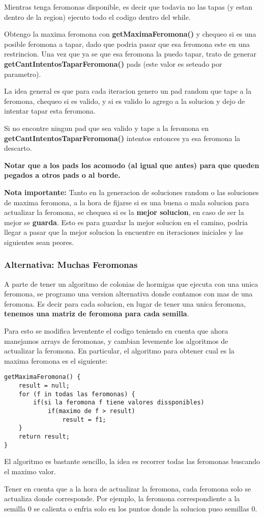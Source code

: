 Mientras tenga feromonas disponible, es decir que todavia no las tapas (y estan dentro de la region) ejecuto todo el codigo dentro del while. 

Obtengo la maxima feromona con \textbf{getMaximaFeromona()} y chequeo si es una posible feromona a tapar, dado que podria pasar que esa feromona este en una restrincion. 
Una vez que ya se que esa feromona la puedo tapar, trato de generar \textbf{getCantIntentosTaparFeromona()} pads (este valor es seteado por parametro). 

La idea general es que para cada iteracion genero un pad random que tape a la feromona, chequeo si es valido, y si es valido lo agrego a la solucion y dejo de intentar tapar esta feromona.

Si no encontre ningun pad que sea valido y tape a la feromona en \textbf{getCantIntentosTaparFeromona()} intentos entonces ya esa feromona la descarto. 

\textbf{Notar que a los pads los acomodo (al igual que antes) para que queden pegados a otros pads o al borde.}

\textbf{Nota importante:} Tanto en la generacion de soluciones random o las soluciones de maxima feromona, a la hora de fijarse si es una buena o mala solucion para actualizar la feromona, se chequea si es la \textbf{mejor solucion}, en caso de ser la mejor se \textbf{guarda}. Esto es para guardar la mejor solucion en el camino, podria llegar a pasar que la mejor solucion la encuentre en iteraciones iniciales y las siguientes sean peores.


\subsubsection{Alternativa: Muchas Feromonas}
A parte de tener un algoritmo de colonias de hormigas que ejecuta con una unica feromona, se programo una version alternativa donde contamos con mas de una feromona. Es decir para cada solucion, en lugar de tener una unica feromona, \textbf{tenemos una matriz de feromona para cada semilla}.
 
Para esto se modifica leventente el codigo teniendo en cuenta que ahora manejamos arrays de feromonas, y cambian levemente los algoritmos de actualizar la feromona. En particular, el algoritmo para obtener cual es la maxima feromona es el siguiente:


\begin{verbatim}
getMaximaFeromona() {
    result = null;
    for (f in todas las feromonas) {
        if(si la feromona f tiene valores dissponibles)
            if(maximo de f > result)
                result = f1;
    }
    return result;
}
\end{verbatim}

El algoritmo es bastante sencillo, la idea es recorrer todas las feromonas buscando el maximo valor. 

Tener en cuenta que a la hora de actualizar la feromona, cada feromona solo se actualiza donde corresponde. Por ejemplo,  la feromona correspondiente a la semilla 0 se calienta o enfria solo en los puntos donde la solucion puso semillas 0. 